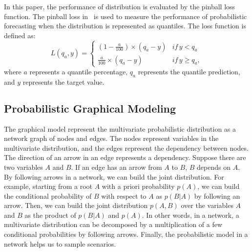 \documentclass[journal]{IEEEtran} %
\begin{document}

 In this paper, the performance of distribution is evaluated by the pinball loss function. The pinball loss in~\cite{Hong2016} is used to measure the performance of probabilistic forecasting when the distribution is represented as quantiles. The loss function is defined as:
\begin{equation}
L({q_a},y) = \left\{ {\begin{array}{*{20}{c}}
  {(1 - \frac{a}{{100}}) \times ({q_a} - y)}&{if\,y < {q_a}} \\ 
  {\frac{a}{{100}} \times ({q_a} - y)}&{if\,y \geq {q_a}},
\end{array}} \right.
\end{equation}
where $a$ represents a quantile percentage, $q_a$ represents the quantile prediction, and $y$ represents the target value.




\subsection{Probabilistic Graphical Modeling}

The  graphical model represent the multivariate probabilistic distribution as a network graph of nodes and edges. 
The nodes represent variables in the multivariate distribution, and the edges represent the dependency between nodes. The direction of an arrow in an edge represents a dependency. Suppose there are two variables $A$ and $B$. If an edge has an arrow from $A$ to $B$, $B$ depends on $A$. By following arrows in a network, we can build the joint distribution. For example, starting from a root $A$ with a priori probability $p(A)$, we can build the conditional probability of $B$ with respect to $A$ as $p(B|A)$ by following an arrow. Then, we can build the joint distribution $p(A,B)$ over the variables $A$ and $B$ as the product of $p(B|A)$ and $p(A)$. In other words, in a network, a multivariate distribution can be decomposed by a multiplication of a few conditional probabilities by following arrows. Finally, the probabilistic model in a network helps us to sample scenarios.  
\end{document}
